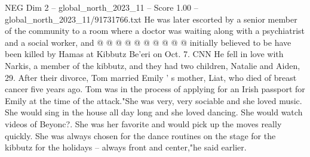 \begin{textsample}{NEG Dim 2 – global\_north\_2023\_11 – Score 1.00 – global\_north\_2023\_11/91731766.txt}
He was later escorted by a senior member of the community to a room where a doctor was waiting along with a psychiatrist and a social worker, and @ @ @ @ @ @ @ @ @ @ initially believed to be have been killed by Hamas at Kibbutz Be'eri on Oct. 7.
CNN He fell in love with Narkis, a member of the kibbutz, and they had two children, Natalie and Aiden, 29.
After their divorce, Tom married Emily ' s mother, Liat, who died of breast cancer five years ago.
Tom was in the process of applying for an Irish passport for Emily at the time of the attack."She was very, very sociable and she loved music.
She would sing in the house all day long and she loved dancing.
She would watch videos of Beyonc?.
She was her favorite and would pick up the moves really quickly.
She was always chosen for the dance routines on the stage for the kibbutz for the holidays -- always front and center,"he said earlier.

\end{textsample}
